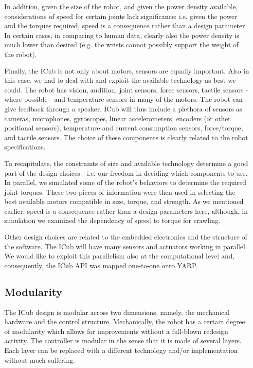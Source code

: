 In addition, given the size of the robot, and given the power density available, 
considerations of speed for certain joints lack significance: i.e. given the 
power and the torques required, speed is a consequence rather than a design 
parameter. In certain cases, in comparing to human data, clearly also the power 
density is much lower than desired (e.g. the wrists cannot possibly support the weight 
of the robot).

Finally, the ICub is not only about motors, sensors are equally important. 
Also in this case, we had to deal with and exploit  the available technology as best we could. 
The robot has vision, audition, joint sensors, force sensors, tactile 
sensors - where possible - and temperature sensors in many of the motors. The robot 
can give feedback through a speaker. ICub will thus include a plethora of sensors as
cameras, microphones, gyroscopes, linear accelerometers, encoders (or other positional
sensors), temperature and current consumption sensors, force/torque, and tactile
sensors. The choice of these components is clearly related to the robot specifications.

To recapitulate, the constraints of size and available technology determine a good 
part of the design choices - i.e. our freedom in deciding which components to use. 
In parallel, we simulated some of the robot's behaviors to determine the required 
joint torques. These two pieces of information were then used in selecting the best 
available motors compatible in size, torque, and strength. As we mentioned earlier, 
speed is a consequence rather than a design parameters here, although, in simulation we 
examined the dependency of speed to torque for crawling.

Other design choices are related to the embedded electronics and the structure of 
the software. The ICub will have many sensors and actuators working in parallel. We 
would like to exploit this parallelism also at the computational level and, consequently, 
the ICub API was mapped one-to-one onto YARP.

\subsection{Modularity}
The ICub design is modular across two dimensions, namely, the mechanical hardware
and the control structure. Mechanically, the robot has a certain degree of modularity
which allows for improvements without a full-blown redesign activity. The controller
is modular in the sense that it is made of several layers. Each layer can be replaced
with a different technology and/or implementation without much suffering.

